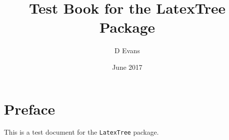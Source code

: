 \documentclass[oneside, 11pt]{book}
\title{Test Book for the LatexTree Package}
\author{D Evans}
\date{June 2017}
\theoremstyle{cumaths}
\begin{document}
\label{book:latextreetest}
\maketitle
\tableofcontents
\newpage

\pagestyle{plain}
\chapter*{Preface}
This is a test document for the {\tt LatexTree} package. 

\pagestyle{fancy}








%

\nocite{*}


\end{document}

